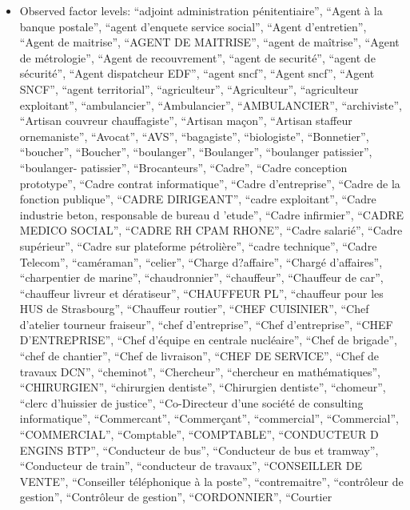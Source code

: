 \documentclass[
  letterpaper,
  DIV=11,
  numbers=noendperiod]{scrartcl}
\providecommand{\tightlist}{%
  \setlength{\itemsep}{0pt}\setlength{\parskip}{0pt}}
\begin{document}
\begin{itemize}
\tightlist
\item
  Observed factor levels: ``adjoint administration pénitentiaire'',
  ``Agent à la banque postale'', ``agent d'enquete service social'',
  ``Agent d'entretien'', ``Agent de maitrise'', ``AGENT DE MAITRISE'',
  ``agent de maîtrise'', ``Agent de métrologie'', ``Agent de
  recouvrement'', ``agent de securité'', ``agent de sécurité'', ``Agent
  dispatcheur EDF'', ``agent sncf'', ``Agent sncf'', ``Agent SNCF'',
  ``agent territorial'', ``agriculteur'', ``Agriculteur'', ``agriculteur
  exploitant'', ``ambulancier'', ``Ambulancier'', ``AMBULANCIER'',
  ``archiviste'', ``Artisan couvreur chauffagiste'', ``Artisan maçon'',
  ``Artisan staffeur ornemaniste'', ``Avocat'', ``AVS'', ``bagagiste'',
  ``biologiste'', ``Bonnetier'', ``boucher'', ``Boucher'',
  ``boulanger'', ``Boulanger'', ``boulanger patissier'', ``boulanger-
  patissier'', ``Brocanteurs'', ``Cadre'', ``Cadre conception
  prototype'', ``Cadre contrat informatique'', ``Cadre d'entreprise'',
  ``Cadre de la fonction publique'', ``CADRE DIRIGEANT'', ``cadre
  exploitant'', ``Cadre industrie beton, responsable de bureau d
  'etude'', ``Cadre infirmier'', ``CADRE MEDICO SOCIAL'', ``CADRE RH
  CPAM RHONE'', ``Cadre salarié'', ``Cadre supérieur'', ``Cadre sur
  plateforme pétrolière'', ``cadre technique'', ``Cadre Telecom'',
  ``caméraman'', ``celier'', ``Charge d?affaire'', ``Chargé
  d'affaires'', ``charpentier de marine'', ``chaudronnier'',
  ``chauffeur'', ``Chauffeur de car'', ``chauffeur livreur et
  dératiseur'', ``CHAUFFEUR PL'', ``chauffeur pour les HUS de
  Strasbourg'', ``Chauffeur routier'', ``CHEF CUISINIER'', ``Chef
  d'atelier tourneur fraiseur'', ``chef d'entreprise'', ``Chef
  d'entreprise'', ``CHEF D'ENTREPRISE'', ``Chef d'équipe en centrale
  nucléaire'', ``Chef de brigade'', ``chef de chantier'', ``Chef de
  livraison'', ``CHEF DE SERVICE'', ``Chef de travaux DCN'',
  ``cheminot'', ``Chercheur'', ``chercheur en mathématiques'',
  ``CHIRURGIEN'', ``chirurgien dentiste'', ``Chirurgien dentiste'',
  ``chomeur'', ``clerc d'huissier de justice'', ``Co-Directeur d'une
  société de consulting informatique'', ``Commercant'', ``Commerçant'',
  ``commercial'', ``Commercial'', ``COMMERCIAL'', ``Comptable'',
  ``COMPTABLE'', ``CONDUCTEUR D ENGINS BTP'', ``Conducteur de bus'',
  ``Conducteur de bus et tramway'', ``Conducteur de train'',
  ``conducteur de travaux'', ``CONSEILLER DE VENTE'', ``Conseiller
  téléphonique à la poste'', ``contremaitre'', ``contrôleur de
  gestion'', ``Contrôleur de gestion'', ``CORDONNIER'', ``Courtier

\end{itemize}
\end{document}
